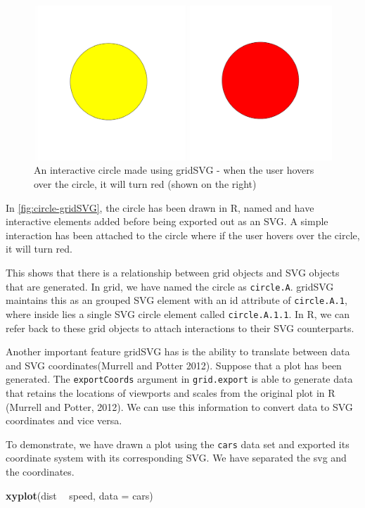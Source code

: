 \documentclass[11pt,]{report}
\newenvironment{Shaded}{\begin{snugshade}}{\end{snugshade}}
\newcommand{\KeywordTok}[1]{\textcolor[rgb]{0.13,0.29,0.53}{\textbf{#1}}}
\newcommand{\DataTypeTok}[1]{\textcolor[rgb]{0.13,0.29,0.53}{#1}}
\newcommand{\StringTok}[1]{\textcolor[rgb]{0.31,0.60,0.02}{#1}}
\newcommand{\OperatorTok}[1]{\textcolor[rgb]{0.81,0.36,0.00}{\textbf{#1}}}
\newcommand{\NormalTok}[1]{#1}
\begin{document}
\begin{figure}[H]

{\centering \includegraphics[width=0.7\linewidth,]{./fig/circle-DOM-1} 

}

\caption{\label{fig:circle-gridSVG} An interactive circle made using gridSVG - when the user hovers over the circle, it will turn red (shown on the right)}\label{fig:unnamed-chunk-30}
\end{figure}

In \autoref{fig:circle-gridSVG}, the circle has been drawn in R, named
and have interactive elements added before being exported out as an SVG.
A simple interaction has been attached to the circle where if the user
hovers over the circle, it will turn red.

This shows that there is a relationship between \textsf{grid} objects
and SVG objects that are generated. In grid, we have named the circle as
\texttt{circle.A}. \textsf{gridSVG} maintains this as an grouped SVG
element with an id attribute of \texttt{circle.A.1}, where inside lies a
single SVG circle element called \texttt{circle.A.1.1}. In R, we can
refer back to these \textsf{grid} objects to attach interactions to
their SVG counterparts.

Another important feature \textsf{gridSVG} has is the ability to
translate between data and SVG coordinates(Murrell and Potter 2012).
Suppose that a plot has been generated. The \texttt{exportCoords}
argument in \texttt{grid.export} is able to generate data that retains
the locations of viewports and scales from the original plot in R
(Murrell and Potter, 2012). We can use this information to convert data
to SVG coordinates and vice versa.

To demonstrate, we have drawn a plot using the \texttt{cars} data set
and exported its coordinate system with its corresponding SVG. We have
separated the svg and the coordinates.

\begin{Shaded}
\begin{Highlighting}[]
\KeywordTok{xyplot}\NormalTok{(dist }\OperatorTok{~}\StringTok{ }\NormalTok{speed, }\DataTypeTok{data =}\NormalTok{ cars)}
\end{Highlighting}
\end{Shaded}
\end{document}
